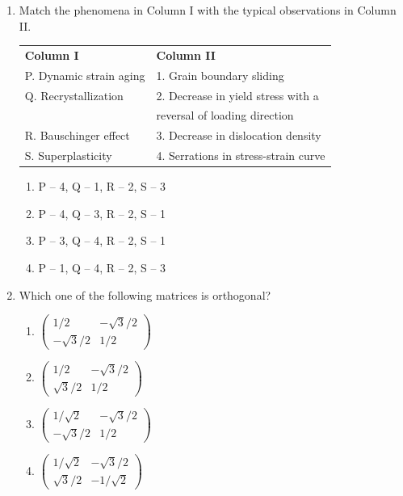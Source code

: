 \documentclass[journal]{IEEEtran}
\theoremstyle{remark}
\begin{document}
\begin{enumerate}[resume]
\item Match the phenomena in Column I with the typical observations in Column II. \hfill{}
\begin{center}
\begin{tabular}{ll}
\textbf{Column I} & \textbf{Column II} \\
P. Dynamic strain aging & 1. Grain boundary sliding \\
Q. Recrystallization & 2. Decrease in yield stress with a \\ & reversal of loading direction \\
R. Bauschinger effect & 3. Decrease in dislocation density \\
S. Superplasticity & 4. Serrations in stress-strain curve \\
\end{tabular}
\end{center}
\begin{enumerate}
\item P – 4, Q – 1, R – 2, S – 3 
\item P – 4, Q – 3, R – 2, S – 1 
\item P – 3, Q – 4, R – 2, S – 1 
\item P – 1, Q – 4, R – 2, S – 3
\end{enumerate}

\item Which one of the following matrices is orthogonal? \hfill{}
\begin{multicols}{2}
\begin{enumerate}
\item $\begin{pmatrix} 1/2 & -\sqrt{3}/2 \\ -\sqrt{3}/2 & 1/2 \end{pmatrix}$
\item $\begin{pmatrix} 1/2 & -\sqrt{3}/2 \\ \sqrt{3}/2 & 1/2 \end{pmatrix}$
\item $\begin{pmatrix} 1/\sqrt{2} & -\sqrt{3}/2 \\ -\sqrt{3}/2 & 1/2 \end{pmatrix}$
\item $\begin{pmatrix} 1/\sqrt{2} & -\sqrt{3}/2 \\ \sqrt{3}/2 & -1/\sqrt{2} \end{pmatrix}$
\end{enumerate}
\end{multicols}


\end{enumerate}
\end{document}
